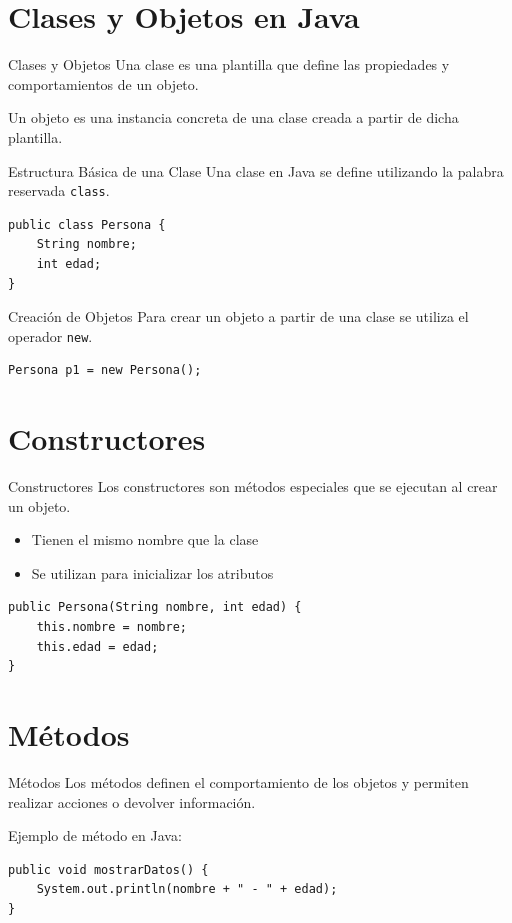 \documentclass{beamer}
\begin{document}
\section{Clases y Objetos en Java}
\begin{frame}{Clases y Objetos}
Una clase es una plantilla que define las propiedades y comportamientos de un objeto.

Un objeto es una instancia concreta de una clase creada a partir de dicha plantilla.
\end{frame}

\begin{frame}[fragile]{Estructura Básica de una Clase}
Una clase en Java se define utilizando la palabra reservada \texttt{class}.

\begin{verbatim}
public class Persona {
    String nombre;
    int edad;
}
\end{verbatim}
\end{frame}

\begin{frame}[fragile]{Creación de Objetos}
Para crear un objeto a partir de una clase se utiliza el operador \texttt{new}.

\begin{verbatim}
Persona p1 = new Persona();
\end{verbatim}
\end{frame}

\section{Constructores}
\begin{frame}[fragile]{Constructores}
Los constructores son métodos especiales que se ejecutan al crear un objeto.

\begin{itemize}
    \item Tienen el mismo nombre que la clase
    \item Se utilizan para inicializar los atributos
\end{itemize}

\begin{verbatim}
public Persona(String nombre, int edad) {
    this.nombre = nombre;
    this.edad = edad;
}
\end{verbatim}
\end{frame}

\section{Métodos}
\begin{frame}[fragile]{Métodos}
Los métodos definen el comportamiento de los objetos y permiten realizar acciones o devolver información.

Ejemplo de método en Java:
\begin{verbatim}
public void mostrarDatos() {
    System.out.println(nombre + " - " + edad);
}
\end{verbatim}
\end{frame}
\end{document}
